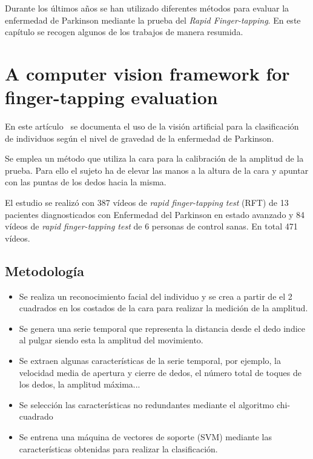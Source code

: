 
Durante los últimos años se han utilizado diferentes métodos para evaluar la enfermedad de Parkinson mediante la prueba del \textit{Rapid Finger-tapping}. En este capítulo se recogen algunos de los trabajos de manera resumida.

\section{A computer vision framework for finger-tapping evaluation}

En este artículo~\cite{khan2014computer} se documenta el uso de la visión artificial para la clasificación de individuos según el nivel de gravedad de la enfermedad de Parkinson.

Se emplea un método que utiliza la cara para la calibración de la amplitud de la prueba. Para ello el sujeto ha de elevar las manos a la altura de la cara y apuntar con las puntas de los dedos hacia la misma.

El estudio se realizó con 387 vídeos de \textit{rapid finger-tapping test} (RFT) de 13 pacientes diagnosticados con Enfermedad del Parkinson en estado avanzado y 84 vídeos de \textit{rapid finger-tapping test} de 6 personas de control sanas. En total 471 vídeos.

\subsection{Metodología}
\begin{itemize}
	\item Se realiza un reconocimiento facial del individuo y se crea a partir de el 2 cuadrados en los costados de la cara para realizar la medición de la amplitud.
	\item Se genera una serie temporal que representa la distancia desde el dedo indice al pulgar siendo esta la amplitud del movimiento.
	\item Se extraen algunas características de la serie temporal, por ejemplo, la velocidad media de apertura y cierre de dedos, el número total de toques de los dedos, la amplitud máxima...
	\item Se selección las características no redundantes mediante el algoritmo chi-cuadrado
	\item Se entrena una máquina de vectores de soporte (SVM) mediante las características obtenidas para realizar la clasificación.

\end{itemize}
